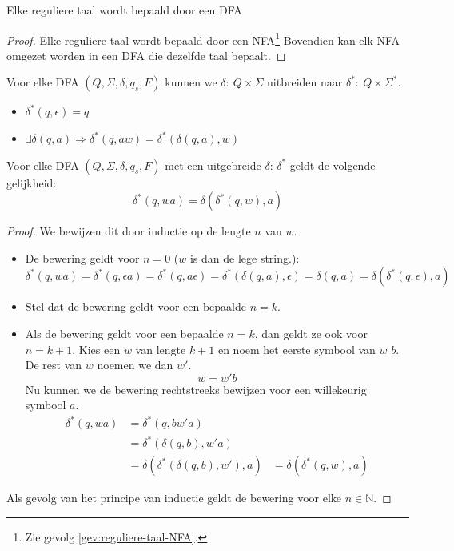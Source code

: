 \documentclass[main.tex]{subfiles}
\begin{document}
\begin{st}
  \label{gev:reguliere-taal-DFA}
  Elke reguliere taal wordt bepaald door een DFA
  
  \begin{proof}
    Elke reguliere taal wordt bepaald door een NFA\footnote{Zie gevolg \ref{gev:reguliere-taal-NFA}.}
    Bovendien kan elk NFA omgezet worden in een DFA die dezelfde taal bepaalt.
  \end{proof}
\end{st}

\begin{de}
  Voor elke DFA $(Q,\Sigma,\delta,q_{s},F)$ kunnen we $\delta:\ Q \times \Sigma$ uitbreiden naar $\delta^{*}:\ Q\times \Sigma^{*}$.
  \begin{itemize}
  \item $\delta^{*}(q,\epsilon) = q$
  \item $\exists \delta(q,a) \Rightarrow \delta^{*}(q,aw) = \delta^{*}(\delta(q,a),w)$
  \end{itemize}
\end{de}

\begin{st}
  \label{st:delta-ster-identiteit}
  Voor elke DFA $(Q,\Sigma,\delta,q_{s},F)$ met een uitgebreide $\delta$: $\delta^{*}$ geldt de volgende gelijkheid:
  \[
  \delta^{*}(q,wa) = \delta(\delta^{*}(q,w),a)
  \] 
  
  \begin{proof}
    We bewijzen dit door inductie op de lengte $n$ van $w$.
    \begin{itemize}
    \item De bewering geldt voor $n=0$ ($w$ is dan de lege string.):
      \[ \delta^{*}(q,wa) = \delta^{*}(q,\epsilon a) = \delta^{*}(q,a\epsilon) = \delta^{*}(\delta(q,a),\epsilon) = \delta(q,a) = \delta(\delta^{*}(q,\epsilon),a) \]
    \item Stel dat de bewering geldt voor een bepaalde $n=k$.
    \item Als de bewering geldt voor een bepaalde $n=k$, dan geldt ze ook voor $n=k+1$.
      Kies een $w$ van lengte $k+1$ en noem het eerste symbool van $w$ $b$.
      De rest van $w$ noemen we dan $w'$.
      \[ w = w'b \]
      Nu kunnen we de bewering rechtstreeks bewijzen voor een willekeurig symbool $a$.
      \[
      \begin{array}{rll}
        \delta^{*}(q,wa) &= \delta^{*}(q,bw'a) &\\
                         &= \delta^{*}(\delta(q,b),w'a) &\\
                         &= \delta(\delta^{*}(\delta(q,b),w'),a) &=\delta(\delta^{*}(q,w),a) 
      \end{array}
      \]
    \end{itemize} 
    Als gevolg van het principe van inductie geldt de bewering voor elke $n\in \mathbb{N}$.
  \end{proof}

\end{st}
\end{document}
